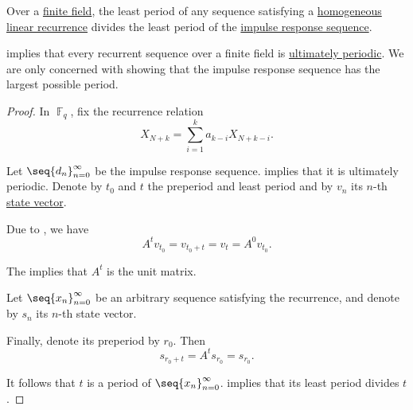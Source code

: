 \begin{proposition}\label{thm:impulse_response_sequence_period}
  Over a \hyperref[def:finite_field]{finite field}, the least period of any sequence satisfying a \hyperref[def:homogeneous_linear_recurrence]{homogeneous linear recurrence} divides the least period of the \hyperref[def:recurrence_relation_space]{impulse response sequence}.
\end{proposition}
\begin{comments}
  \item {} implies that every recurrent sequence over a finite field is \hyperref[def:ultimately_periodic_sequence]{ultimately periodic}. We are only concerned with showing that the impulse response sequence has the largest possible period.
\end{comments}
\begin{proof}
  In \( \BbbF_q \), fix the recurrence relation
  \begin{equation*}
    X_{N+k} = \sum_{i=1}^k a_{k-i} X_{N+k-i}.
  \end{equation*}

  Let \( \seq{ d_n }_{n=0}^\infty \) be the impulse response sequence.  implies that it is ultimately periodic. Denote by \( t_0 \) and \( t \) the preperiod and least period and by \( v_n \) its \( n \)-th \hyperref[def:recurrence_relation/state]{state vector}.

  Due to , we have
  \begin{equation*}
    A^t v_{t_0} = v_{t_0 + t} = v_t = A^0 v_{t_0}.
  \end{equation*}

  The  implies that \( A^t \) is the unit matrix.

  Let \( \seq{ x_n }_{n=0}^\infty \) be an arbitrary sequence satisfying the recurrence, and denote by \( s_n \) its \( n \)-th state vector.

  Finally, denote its preperiod by \( r_0 \). Then
  \begin{equation*}
    s_{r_0 + t}
    =
    A^t s_{r_0}
    =
    s_{r_0}.
  \end{equation*}

  It follows that \( t \) is a period of \( \seq{ x_n }_{n=0}^\infty \).  implies that its least period divides \( t \).
\end{proof}


